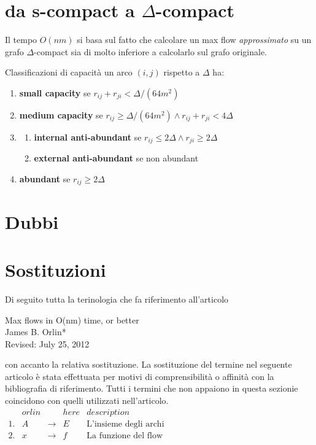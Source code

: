 \documentclass[a4paper, 11pt]{report}
\begin{document}
\section{da s-compact a $\Delta$-compact}
Il tempo $O(nm)$ si basa sul fatto che calcolare un max flow \textit{approssimato} su un grafo $\Delta$-compact sia di molto inferiore a calcolarlo sul grafo originale.
\begin{definition}{Classificazioni di capacità}{}
    un arco $(i,j)$ rispetto a $\Delta$ ha:
    \begin{enumerate}
        \item \textbf{small capacity} se $r_{ij}+r_{ji} < \Delta/(64m^2)$
        \item \textbf{medium capacity} se $r_{ij} \ge \Delta/(64m^2) \land r_{ij}+r_{ji} < 4\Delta$
        \item \begin{enumerate}
            \item \textbf{internal anti-abundant} se $r_{ij} \le 2\Delta \land r_{ji} \ge 2\Delta$
            \item \textbf{external anti-abundant} se non abundant 
        \end{enumerate}
        \item \textbf{abundant} se $r_{ij} \ge 2\Delta$
    \end{enumerate}
    
\end{definition}


\newpage
\section{Dubbi}
    
\section{Sostituzioni}
Di seguito tutta la terinologia che fa riferimento all'articolo
\begin{center}
    Max flows in O(nm) time, or better\\
    James B. Orlin*\\
    Revised: July 25, 2012\\
\end{center}
con accanto la relativa sostituzione. La sostituzione del termine nel seguente articolo è stata effettuata per 
motivi di comprensibilità o affinità con la bibliografia di riferimento. Tutti i termini che non appaiono in questa
 sezionie coincidono con quelli utilizzati nell'articolo.\\
$\begin{array}{lcccl}
      &orlin&          &here& description\\\hline
    1.& A & \rightarrow &E& \text{L'insieme degli archi}\\
    2.& x & \rightarrow &f& \text{La funzione del flow}
\end{array}$
\end{document}
